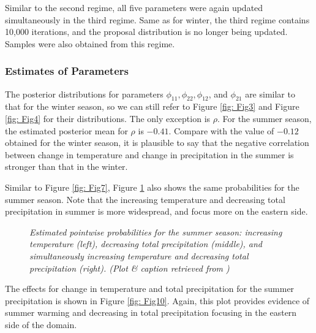 \documentclass{article}
\begin{document}
Similar to the second regime, all five parameters were again updated simultaneously in the third regime. Same as for winter, the third regime contains 10,000 iterations, and the proposal distribution is no longer being updated. Samples were also obtained from this regime.  

\subsubsection{Estimates of Parameters}
\label{sec: SumParams}
The posterior distributions for parameters $\phi_{11}, \phi_{22}, \phi_{12}$, and $\phi_{21}$ are similar to that for the winter season, so we can still refer to Figure \ref{fig: Fig3} and Figure \ref{fig: Fig4} for their distributions. The only exception is $\rho$. For the summer season, the estimated posterior mean for $\rho$ is $-0.41$. Compare with the value of $-0.12$ \cite{paper} obtained for the winter season, it is plausible to say that the negative correlation between change in temperature and change in precipitation in the summer is stronger than that in the winter. 

Similar to Figure \ref{fig: Fig7}, Figure \ref{fig: Fig12} also shows the same probabilities for the summer season. Note that the increasing temperature and decreasing total precipitation in summer is more widespread, and focus more on the eastern side.

\begin{figure}
  \centering
  \caption{\small \emph{Estimated pointwise probabilities for the summer season: increasing temperature (left), decreasing total precipitation (middle), and simultaneously increasing temperature and decreasing total precipitation (right). (Plot \& caption retrieved from \cite{paper})}}
  \label{fig: Fig12}
\end{figure}

The effects for change in temperature and total precipitation for the summer precipitation is shown in Figure \ref{fig: Fig10}. Again, this plot provides evidence of summer warming and decreasing in total precipitation focusing in the eastern side of the domain.
\end{document}
